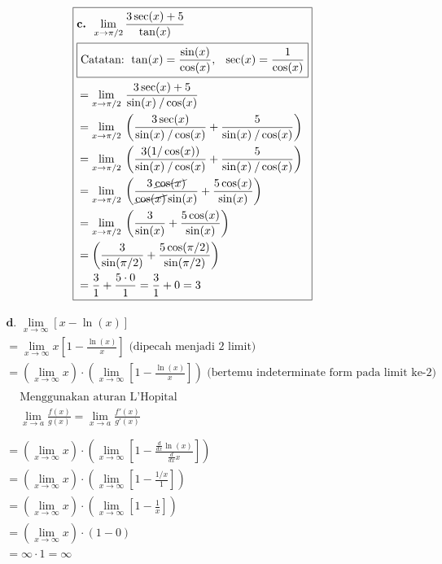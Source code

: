 \documentclass[12pt]{article}
\begin{document}
\begin{fleqn}[2em]
\begin{align*}
\boxed{
\begin{aligned}
  & \textbf{c. } \lim_{x \to \pi/2} \frac{3 \sec(x) + 5}{\tan(x)} \\
  & \boxed{\text{Catatan: } \tan(x) = \frac{\sin(x)}{\cos(x)},\:~\:\sec(x) = \frac{1}{\cos(x)}} \\
  & = \lim_{x \to \pi/2}\:\frac{3 \sec(x) + 5}{\sin(x)\:/\cos(x)} \\
  & = \lim_{x \to \pi/2}\:\left(\frac{3 \sec(x)}{\sin(x)\:/\cos(x)} + \frac{5}{\sin(x)\:/\cos(x)}\right)\\
  & = \lim_{x \to \pi/2}\:\left(\frac{3(1/\cos(x))}{\sin(x)\:/\cos(x)} + \frac{5}{\sin(x)\:/\cos(x)}\right)\\
  & = \lim_{x \to \pi/2}\:\left(\frac{3\:\cancel{\cos(x)}}{\cancel{\cos(x)}\sin(x)} + \frac{5\cos(x)}{\sin(x)}\right) \\
  & = \lim_{x \to \pi/2}\:\left(\frac{3}{\sin(x)} + \frac{5\cos(x)}{\sin(x)}\right) \\
  & = \left(\frac{3}{\sin(\pi/2)} + \frac{5\cos(\pi/2)}{\sin(\pi/2)}\right) \\
  & = \frac{3}{1} + \frac{5 \cdot 0}{1} = \frac{3}{1} + 0 = 3
\end{aligned}
}
\end{align*}


\begin{align*}
\boxed{
\begin{aligned}
  & \textbf{d. } \lim_{x \to \infty} [x - \ln(x)] \\
  & = \lim _{x\to \infty}x\left[1-\frac{\ln \left(x\right)}{x}\right] \text{ (dipecah menjadi 2 limit)} \\
  & = \left(\lim _{x\to \infty}x\right) \cdot \left(\lim_{x\to \infty}\left[1 - \frac{\ln(x)}{x}\right]\right) \text{ (bertemu indeterminate form pada limit ke-2)}\\
  & \boxed{
    \begin{aligned}
      & \text{Menggunakan aturan L'Hopital} \\
      & \lim_{x \to a} \frac{f(x)}{g(x)} = \lim_{x \to a} \frac{f'(x)}{g'(x)} \\
    \end{aligned}
  } \\
  & = \left(\lim _{x\to \infty}x\right) \cdot \left(\lim_{x\to \infty}\left[1 - \frac{\frac{d}{dx}\ln(x)}{\frac{d}{dx}x}\right]\right) \\
  & = \left(\lim _{x\to \infty}x\right) \cdot \left(\lim_{x\to \infty}\left[1 - \frac{1/x}{1}\right]\right) \\
  & = \left(\lim _{x\to \infty}x\right) \cdot \left(\lim_{x\to \infty}\left[1 - \frac{1}{x}\right]\right) \\
  & = \left(\lim _{x\to \infty}x\right) \cdot (1 - 0) \\
  & = \infty \cdot 1 = \infty
\end{aligned}
}
\end{align*}



\end{fleqn}
\end{document}
